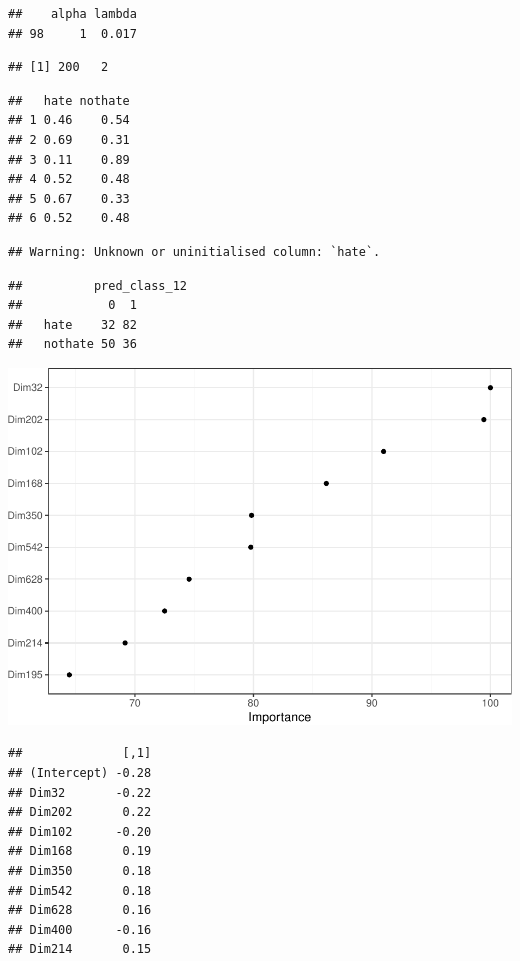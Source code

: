 \documentclass[
  english,
  man]{apa6}
\begin{document}
\begin{verbatim}
##    alpha lambda
## 98     1  0.017
\end{verbatim}

\begin{verbatim}
## [1] 200   2
\end{verbatim}

\begin{verbatim}
##   hate nothate
## 1 0.46    0.54
## 2 0.69    0.31
## 3 0.11    0.89
## 4 0.52    0.48
## 5 0.67    0.33
## 6 0.52    0.48
\end{verbatim}

\begin{verbatim}
## Warning: Unknown or uninitialised column: `hate`.
\end{verbatim}

\begin{verbatim}
##          pred_class_12
##            0  1
##   hate    32 82
##   nothate 50 36
\end{verbatim}

\includegraphics{analysis_files/figure-latex/unnamed-chunk-12-2.pdf}

\begin{verbatim}
##              [,1]
## (Intercept) -0.28
## Dim32       -0.22
## Dim202       0.22
## Dim102      -0.20
## Dim168       0.19
## Dim350       0.18
## Dim542       0.18
## Dim628       0.16
## Dim400      -0.16
## Dim214       0.15
\end{verbatim}
\end{document}
